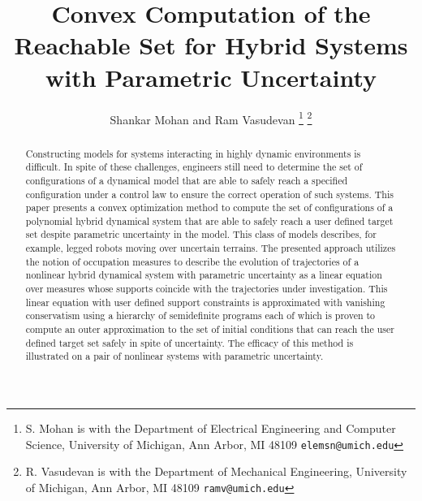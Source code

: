 \documentclass[letterpaper]{ieeeconf}
\title{Convex Computation of the Reachable Set for Hybrid Systems with Parametric Uncertainty}
\author{Shankar Mohan and Ram Vasudevan \vspace*{-0.75cm}
 \thanks{S. Mohan is with the Department of Electrical Engineering and Computer Science, University of Michigan, Ann Arbor, MI 48109
{\scriptsize \texttt{elemsn@umich.edu}}}
 \thanks{R. Vasudevan is with the Department of Mechanical Engineering, University of Michigan, Ann Arbor, MI 48109
{\scriptsize \texttt{ramv@umich.edu}}}%
}
\theoremstyle{definition}
\begin{document}
\maketitle
  \begin{abstract}
	Constructing models for systems interacting in highly dynamic environments is difficult.
	In spite of these challenges, engineers still need to determine the set of configurations of a dynamical model that are able to safely reach a specified configuration under a control law to ensure the correct operation of such systems.
	This paper presents a convex optimization method to compute the set of configurations of a polynomial hybrid dynamical system that are able to safely reach a user defined target set despite parametric uncertainty in the model.
	This class of models describes, for example, legged robots moving over uncertain terrains.
	The presented approach utilizes the notion of occupation measures to describe the evolution of trajectories of a nonlinear hybrid dynamical system with parametric uncertainty as a linear equation over measures whose supports coincide with the trajectories under investigation.
	This linear equation with user defined support constraints is approximated with vanishing conservatism using a hierarchy of semidefinite programs each of which is proven to compute an outer approximation to the set of initial conditions that can reach the user defined target set safely in spite of uncertainty.
	The efficacy of this method is illustrated on a pair of nonlinear systems with parametric uncertainty.
  \end{abstract}
  
  
  
  
  
  


\end{document}
